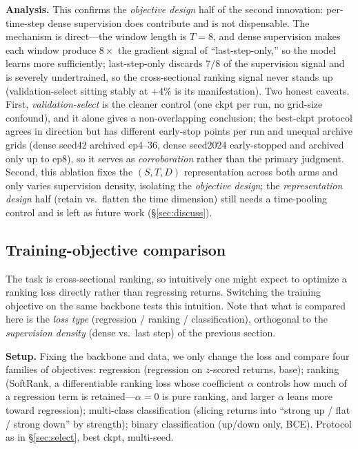 \documentclass[a4paper,11pt]{article}
\begin{document}
\textbf{Analysis.} This confirms the \emph{objective design} half of the
second innovation: per-time-step dense supervision does contribute and is not
dispensable. The mechanism is direct---the window length is $T{=}8$, and dense
supervision makes each window produce $8\times$ the gradient signal of
``last-step-only,'' so the model learns more sufficiently; last-step-only
discards $7/8$ of the supervision signal and is severely undertrained, so the
cross-sectional ranking signal never stands up (validation-select sitting
stably at $+4\%$ is its manifestation). Two honest caveats. First,
\emph{validation-select} is the cleaner control (one ckpt per run, no
grid-size confound), and it alone gives a non-overlapping conclusion; the
best-ckpt protocol agrees in direction but has different early-stop points per
run and unequal archive grids (dense seed42 archived ep4--36, dense seed2024
early-stopped and archived only up to ep8), so it serves as
\emph{corroboration} rather than the primary judgment. Second, this ablation
fixes the $(S,T,D)$ representation across both arms and only varies supervision
density, isolating the \emph{objective design}; the \emph{representation
design} half (retain vs.\ flatten the time dimension) still needs a
time-pooling control and is left as future work (\S\ref{sec:discuss}).

\subsection{Training-objective comparison}\label{sec:objective}
The task is cross-sectional ranking, so intuitively one might expect to
optimize a ranking loss directly rather than regressing returns. Switching the
training objective on the same backbone tests this intuition. Note that what is
compared here is the \emph{loss type} (regression / ranking / classification),
orthogonal to the \emph{supervision density} (dense vs.\ last step) of the
previous section.

\textbf{Setup.} Fixing the backbone and data, we only change the loss
and compare four families of objectives: regression (regression on
$z$-scored returns, base); ranking (SoftRank, a differentiable ranking loss
whose coefficient $\alpha$ controls how much of a regression term is
retained---$\alpha{=}0$ is pure ranking, and larger $\alpha$ leans more toward
regression); multi-class classification (slicing returns into ``strong up /
flat / strong down'' by strength); binary classification (up/down only, BCE).
Protocol as in \S\ref{sec:select}, best ckpt, multi-seed.
\end{document}
